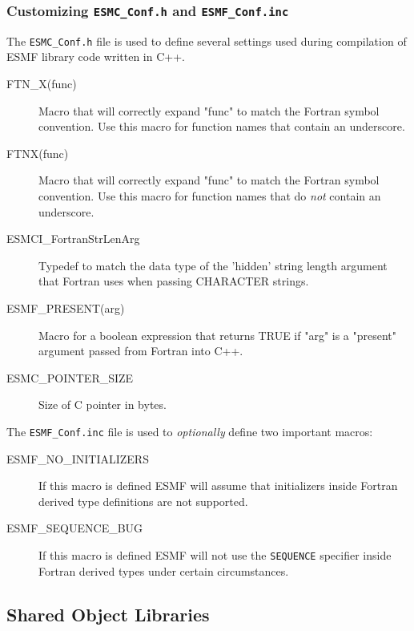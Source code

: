 \subsubsection{Customizing {\tt ESMC\_Conf.h} and {\tt ESMF\_Conf.inc}}

The {\tt ESMC\_Conf.h} file is used to define several settings used
during compilation of ESMF library code written in C++.

\begin{description}

\item[FTN\_X(func)]
Macro that will correctly expand "func" to match the Fortran symbol convention.
Use this macro for function names that contain an underscore.

\item[FTNX(func)]
Macro that will correctly expand "func" to match the Fortran symbol convention.
Use this macro for function names that do {\em not} contain an underscore.

\item[ESMCI\_FortranStrLenArg]
Typedef to match the data type of the 'hidden' string length argument that
Fortran uses when passing CHARACTER strings.

\item[ESMF\_PRESENT(arg)]
Macro for a boolean expression that returns TRUE if "arg" is a "present"
argument passed from Fortran into C++.

\item[ESMC\_POINTER\_SIZE]
Size of C pointer in bytes.

\end{description}


The {\tt ESMF\_Conf.inc} file is used to {\em optionally} define two 
important macros:

\begin{description}

\item[ESMF\_NO\_INITIALIZERS]
If this macro is defined ESMF will assume that initializers inside 
Fortran derived type definitions are not supported.

\item[ESMF\_SEQUENCE\_BUG]
If this macro is defined ESMF will not use the {\tt SEQUENCE} specifier
inside Fortran derived types under certain circumstances.

\end{description}


\subsection{Shared Object Libraries}

